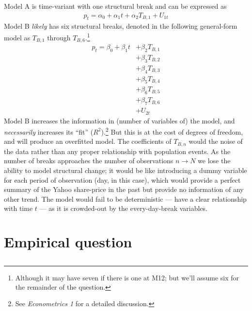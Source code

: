 \documentclass{article}\usepackage[]{graphicx}\usepackage[]{color}
\begin{document}
    Model A is time-variant with one structural break and can be expressed as
      \begin{align*}
        p_{t} = \alpha_0 + \alpha_1 t + \alpha_2 T_{B,1} + U_{1t}
      \end{align*}
    Model B \textit{likely} has six structural breaks, denoted in the following general-form model as $T_{B,1}$ through $T_{B,6}$.\footnote{Although it may have seven if there is one at M12; but we'll assume six for the remainder of the question.}
      \begin{align*}
        p_{t} = \beta_0 + \beta_1 t &+ \beta_2 T_{B,1}  \\
                                    &+ \beta_3 T_{B,2} \\
                                    &+ \beta_4 T_{B,3} \\
                                    &+ \beta_5 T_{B,4} \\
                                    &+ \beta_6 T_{B,5} \\
                                    &+ \beta_7 T_{B,6} \\
                                    &+ U_{2t}
      \end{align*}
    Model B increases the information in (number of variables of) the model, and \textit{necessarily} increases its ``fit'' ($R^2$).\footnote{See \textit{Econometrics 1} for a detailed discussion.} But this is at the cost of degrees of freedom, and will produce an overfitted model. The coefficients of $T_{B,n}$ would the noise of the data rather than any proper relationship with population events. As the number of breaks approaches the number of observations $n \xrightarrow\ N$ we lose the ability to model structural change; it would be like introducing a dummy variable for each period of observation (day, in this case), which would provide a perfect summary of the Yahoo share-price in the past but provide no information of any other trend. The model would fail to be deterministic --- have a clear relationship with time $t$ --- as it is crowded-out by the every-day-break variables.


  \newpage  
\section{Empirical question}

\subsection{}\label{subsec21}
\end{document}
